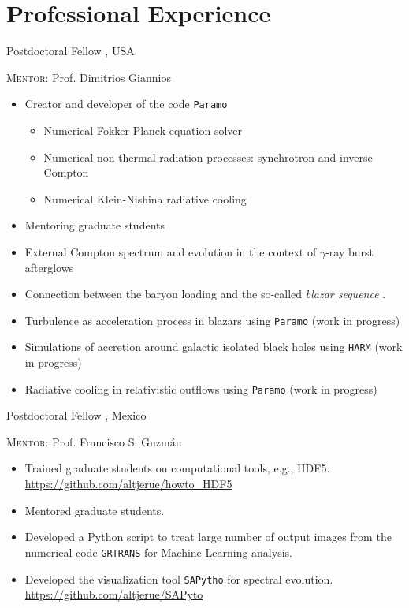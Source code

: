 \section{Professional Experience}

%
{\DPA}%
{Postdoctoral Fellow}%
{}%
{\Purdue, USA}%
{\textsc{Mentor}: Prof. Dimitrios Giannios%
  \begin{itemize}
    \item Creator and developer of the code \texttt{Paramo}
    \begin{itemize}
      \item Numerical Fokker-Planck equation solver
      \item Numerical non-thermal radiation processes: synchrotron and inverse Compton
      \item Numerical Klein-Nishina radiative cooling
    \end{itemize}
    \item Mentoring graduate students
    \item External Compton spectrum and evolution in the context of $\gamma$-ray burst afterglows \cite{Zhang:2020ch}
    \item Connection between the baryon loading and the so-called \emph{blazar sequence} \cite{RuedaBecerril:2020ha}.
    \item Turbulence as acceleration process in blazars using \texttt{Paramo} (work in progress)
    \item Simulations of accretion around galactic isolated black holes using \texttt{HARM} (work in progress)
    \item Radiative cooling in relativistic outflows using \texttt{Paramo} (work in progress)
  \end{itemize}
}
%
{\IFMes}%
{Postdoctoral Fellow}%
{}%
{\UMSNHes, Mexico}%
{\textsc{Mentor}: Prof. Francisco S. Guzmán
  \begin{itemize}
    \item Trained graduate students on computational tools, e.g., HDF5. \url{https://github.com/altjerue/howto_HDF5}
    \item Mentored graduate students.
    \item Developed a Python script to treat large number of output images from the numerical code \texttt{GRTRANS} for Machine Learning analysis.
    \item Developed the visualization tool \texttt{SAPytho} for spectral evolution. \url{https://github.com/altjerue/SAPyto}
  \end{itemize}
}
